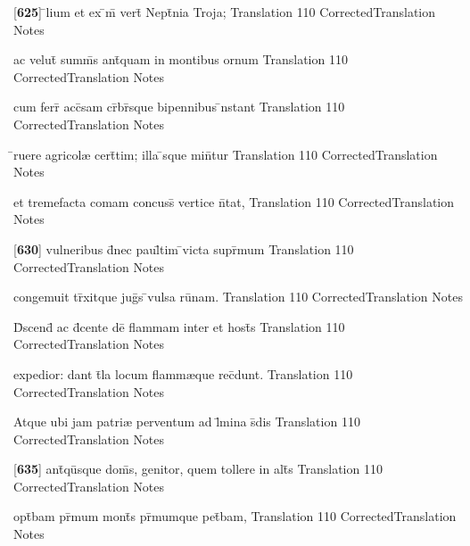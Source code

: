 \latline
  {[\textbf{625}] \={}lium et ex \={\macron {\i}}m\={} vert\={\macron {\i}} Nept\={}nia Troja;}
  { Translation }
  {110}
  { CorrectedTranslation }
  { Notes }


\latline
  {ac velut\={\macron {\i}} summ\={\macron {\i}}s ant\={\macron {\i}}quam in montibus ornum}
  { Translation }
  {110}
  { CorrectedTranslation }
  { Notes }


\latline
  {cum ferr\={} acc\={\macron {\i}}sam cr\={}br\={\macron {\i}}sque bipennibus \={\macron {\i}}nstant}
  { Translation }
  {110}
  { CorrectedTranslation }
  { Notes }


\latline
  {\={}ruere agricol{\ae} cert\={}tim; illa \={}sque min\={}tur}
  { Translation }
  {110}
  { CorrectedTranslation }
  { Notes }


\latline
  {et tremefacta comam concuss\={} vertice n\={}tat,}
  { Translation }
  {110}
  { CorrectedTranslation }
  { Notes }


\latline
  {[\textbf{630}] vulneribus d\={}nec paul\={}tim \={}victa supr\={}mum}
  { Translation }
  {110}
  { CorrectedTranslation }
  { Notes }


\latline
  {congemuit tr\={}xitque jug\={\macron {\i}}s \={}vulsa ru\={\macron {\i}}nam.}
  { Translation }
  {110}
  { CorrectedTranslation }
  { Notes }


\latline
  {D\={}scend\={} ac d\={}cente de\={} flammam inter et host\={\macron {\i}}s}
  { Translation }
  {110}
  { CorrectedTranslation }
  { Notes }


\latline
  {expedior: dant t\={}la locum flamm{\ae}que rec\={}dunt.}
  { Translation }
  {110}
  { CorrectedTranslation }
  { Notes }


\latline
  {Atque ubi jam patri{\ae} perventum ad l\={\macron {\i}}mina s\={}dis}
  { Translation }
  {110}
  { CorrectedTranslation }
  { Notes }


\latline
  {[\textbf{635}] ant\={\macron {\i}}qu\={}sque dom\={}s, genitor, quem tollere in alt\={}s}
  { Translation }
  {110}
  { CorrectedTranslation }
  { Notes }


\latline
  {opt\={}bam pr\={\macron {\i}}mum mont\={\macron {\i}}s pr\={\macron {\i}}mumque pet\={}bam,}
  { Translation }
  {110}
  { CorrectedTranslation }
  { Notes }


